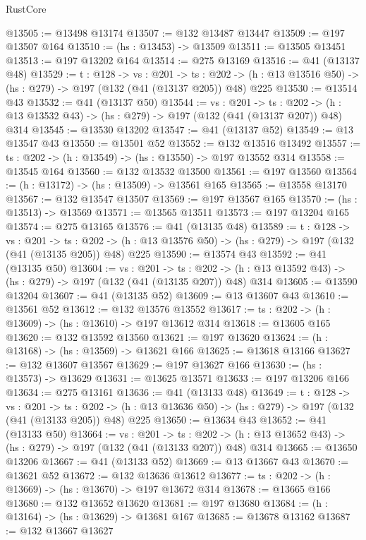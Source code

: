 \begin{lexlean}{RustCore}
\begin{coremodule}
@13505 := @13498 @13174
@13507 := @132 @13487 @13447
@13509 := @197 @13507 @164
@13510 := (hs : @13453) -> @13509
@13511 := @13505 @13451
@13513 := @197 @13202 @164
@13514 := @275 @13169
@13516 := @41 (@13137 @48)
@13529 := {t : @128} ->
  {vs : @201} ->
  {ts : @202} -> (h : @13 @13516 @50) -> (hs : @279) -> @197 (@132 (@41 (@13137 @205)) @48) @225
@13530 := @13514 @43
@13532 := @41 (@13137 @50)
@13544 := {vs : @201} ->
  {ts : @202} -> (h : @13 @13532 @43) -> (hs : @279) -> @197 (@132 (@41 (@13137 @207)) @48) @314
@13545 := @13530 @13202
@13547 := @41 (@13137 @52)
@13549 := @13 @13547 @43
@13550 := @13501 @52
@13552 := @132 @13516 @13492
@13557 := {ts : @202} -> (h : @13549) -> (hs : @13550) -> @197 @13552 @314
@13558 := @13545 @164
@13560 := @132 @13532 @13500
@13561 := @197 @13560
@13564 := (h : @13172) -> (hs : @13509) -> @13561 @165
@13565 := @13558 @13170
@13567 := @132 @13547 @13507
@13569 := @197 @13567 @165
@13570 := (hs : @13513) -> @13569
@13571 := @13565 @13511
@13573 := @197 @13204 @165
@13574 := @275 @13165
@13576 := @41 (@13135 @48)
@13589 := {t : @128} ->
  {vs : @201} ->
  {ts : @202} -> (h : @13 @13576 @50) -> (hs : @279) -> @197 (@132 (@41 (@13135 @205)) @48) @225
@13590 := @13574 @43
@13592 := @41 (@13135 @50)
@13604 := {vs : @201} ->
  {ts : @202} -> (h : @13 @13592 @43) -> (hs : @279) -> @197 (@132 (@41 (@13135 @207)) @48) @314
@13605 := @13590 @13204
@13607 := @41 (@13135 @52)
@13609 := @13 @13607 @43
@13610 := @13561 @52
@13612 := @132 @13576 @13552
@13617 := {ts : @202} -> (h : @13609) -> (hs : @13610) -> @197 @13612 @314
@13618 := @13605 @165
@13620 := @132 @13592 @13560
@13621 := @197 @13620
@13624 := (h : @13168) -> (hs : @13569) -> @13621 @166
@13625 := @13618 @13166
@13627 := @132 @13607 @13567
@13629 := @197 @13627 @166
@13630 := (hs : @13573) -> @13629
@13631 := @13625 @13571
@13633 := @197 @13206 @166
@13634 := @275 @13161
@13636 := @41 (@13133 @48)
@13649 := {t : @128} ->
  {vs : @201} ->
  {ts : @202} -> (h : @13 @13636 @50) -> (hs : @279) -> @197 (@132 (@41 (@13133 @205)) @48) @225
@13650 := @13634 @43
@13652 := @41 (@13133 @50)
@13664 := {vs : @201} ->
  {ts : @202} -> (h : @13 @13652 @43) -> (hs : @279) -> @197 (@132 (@41 (@13133 @207)) @48) @314
@13665 := @13650 @13206
@13667 := @41 (@13133 @52)
@13669 := @13 @13667 @43
@13670 := @13621 @52
@13672 := @132 @13636 @13612
@13677 := {ts : @202} -> (h : @13669) -> (hs : @13670) -> @197 @13672 @314
@13678 := @13665 @166
@13680 := @132 @13652 @13620
@13681 := @197 @13680
@13684 := (h : @13164) -> (hs : @13629) -> @13681 @167
@13685 := @13678 @13162
@13687 := @132 @13667 @13627

\end{coremodule}
\end{lexlean}
